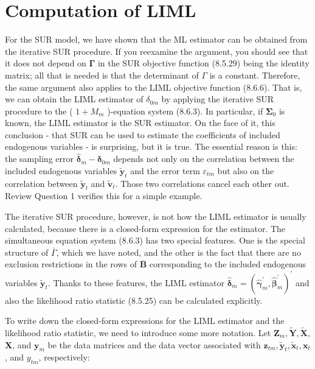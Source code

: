 \documentclass[10pt]{article}
\begin{document}
\section*{Computation of LIML}
For the SUR model, we have shown that the ML estimator can be obtained from the iterative SUR procedure. If you reexamine the argument, you should see that it does not depend on $\boldsymbol{\Gamma}$ in the SUR objective function (8.5.29) being the identity matrix; all that is needed is that the determinant of $\Gamma$ is a constant. Therefore, the same argument also applies to the LIML objective function (8.6.6). That is, we can obtain the LIML estimator of $\delta_{0 m}$ by applying the iterative SUR procedure to the ( $1+M_{m}$ )-equation system (8.6.3). In particular, if $\boldsymbol{\Sigma}_{0}$ is known, the LIML estimator is the SUR estimator. On the face of it, this conclusion - that SUR can be used to estimate the coefficients of included endogenous variables - is surprising, but it is true. The essential reason is this: the sampling error $\hat{\boldsymbol{\delta}}_{m}-\boldsymbol{\delta}_{0 m}$ depends not only on the correlation between the included endogenous variables $\tilde{\mathbf{y}}_{t}$ and the error term $\varepsilon_{t m}$ but also on the correlation between $\tilde{\mathbf{y}}_{t}$ and $\tilde{\mathbf{v}}_{t}$. Those two correlations cancel each other out. Review Question 1 verifies this for a simple example.

The iterative SUR procedure, however, is not how the LIML estimator is usually calculated, because there is a closed-form expression for the estimator. The simultaneous equation system (8.6.3) has two special features. One is the special structure of $\bar{\Gamma}$, which we have noted, and the other is the fact that there are no exclusion restrictions in the rows of $\overline{\mathbf{B}}$ corresponding to the included endogenous variables $\tilde{\mathbf{y}}_{t}$. Thanks to these features, the LIML estimator $\hat{\boldsymbol{\delta}}_{m}=\left(\hat{\boldsymbol{\gamma}}_{m}^{\prime}, \widehat{\boldsymbol{\beta}}_{m}^{\prime}\right)^{\prime}$ and also the likelihood ratio statistic (8.5.25) can be calculated explicitly.

To write down the closed-form expressions for the LIML estimator and the likelihood ratio statistic, we need to introduce some more notation. Let $\mathbf{Z}_{m}, \widetilde{\mathbf{Y}}, \widetilde{\mathbf{X}}$, $\mathbf{X}$, and $\mathbf{y}_{m}$ be the data matrices and the data vector associated with $\mathbf{z}_{t m}, \tilde{\mathbf{y}}_{t}, \tilde{\mathbf{x}}_{t}, \mathbf{x}_{t}$, and $y_{t m}$, respectively:
\end{document}
